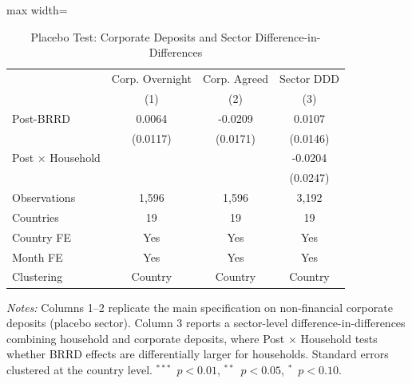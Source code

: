 \begin{table}[htbp]
\centering
\caption{Placebo Test: Corporate Deposits and Sector Difference-in-Differences}
\label{tab:placebo}
\begin{adjustbox}{max width=\textwidth}
\begin{tabular}{lccc}
\toprule
 & Corp. Overnight & Corp. Agreed & Sector DDD \\
 & (1) & (2) & (3) \\
\midrule
Post-BRRD & 0.0064 & -0.0209 & 0.0107 \\
 & (0.0117) & (0.0171) & (0.0146) \\
Post $\times$ Household & & & -0.0204 \\
 & & & (0.0247) \\
\midrule
Observations & 1,596 & 1,596 & 3,192 \\
Countries & 19 & 19 & 19 \\
Country FE & Yes & Yes & Yes \\
Month FE & Yes & Yes & Yes \\
Clustering & Country & Country & Country \\
\bottomrule
\end{tabular}
\end{adjustbox}
\begin{tablenotes}[flushleft]
\small
\item \textit{Notes:} Columns 1--2 replicate the main specification on non-financial corporate deposits (placebo sector). Column 3 reports a sector-level difference-in-differences combining household and corporate deposits, where Post $\times$ Household tests whether BRRD effects are differentially larger for households. Standard errors clustered at the country level. $^{***}$~$p<0.01$, $^{**}$~$p<0.05$, $^{*}$~$p<0.10$.
\end{tablenotes}
\end{table}
